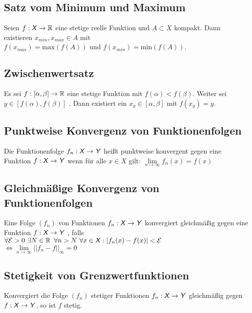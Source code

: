 \documentclass[german]{latex4ei/latex4ei_sheet}
\begin{document}
\begin{sectionbox}
	\subsection{Satz vom Minimum und Maximum}
	Seien $f : \operatorname{\textsf{\textit{X}}} \rightarrow \operatorname{\mathbb R}$ eine stetige reelle Funktion und $A \subset X$ kompakt. Dann existieren $x_{min},x_{max} \in A$ mit $f(x_{max}) = \text{max} (f(A)) \text{ und } f(x_{min}) = \text{min} (f(A))$.

\end{sectionbox}

\begin{sectionbox}
	\subsection{Zwischenwertsatz}
	Es sei $f : [\alpha,\beta] \rightarrow \operatorname{\mathbb R}$ eine stetige Funktion mit $f(\alpha) < f(\beta)$. Weiter sei $y \in [f(\alpha),f(\beta)]$ . Dann existiert ein $x_y \in [\alpha,\beta]$ mit $f(x_y) = y$.

\end{sectionbox}


\begin{sectionbox}
	\subsection{Punktweise Konvergenz von Funktionenfolgen}
	Die Funktionenfolge $f_n : \operatorname{\textsf{\textit{X}}} \rightarrow \operatorname{\textsf{\textit{Y}}}$ heißt punktweise konvergent gegen eine Funktion $f : \operatorname{\textsf{\textit{X}}} \rightarrow \operatorname{\textsf{\textit{Y}}}$ wenn für alle $x \in X$ gilt: $\lim \limits_{n \to \infty} f_n(x)=f(x)$
	
	\end{sectionbox}


\begin{sectionbox}
	\subsection{Gleichmäßige Konvergenz von Funktionenfolgen}
	Eine Folge $(f_n)$ von Funktionen $f_n : \operatorname{\textsf{\textit{X}}} \rightarrow \operatorname{\textsf{\textit{Y}}}$ konvergiert
gleichmäßig  gegen eine Funktion $f : \operatorname{\textsf{\textit{X}}} \rightarrow \operatorname{\textsf{\textit{Y}}}$ , falls \\
	$\forall \mathcal{E}>0 \text{  } \exists N \in \operatorname{\mathbb R} \text{   } \forall n > N \text{   } \forall x \in \operatorname{\textsf{\textit{X}}}: |f_n(x)-f(x)|<\mathcal{E}$\\
	$\Leftrightarrow \lim \limits_{n \to \infty} ||f_n-f ||_\infty = 0$


\end{sectionbox}
\begin{sectionbox}
	\subsection{Stetigkeit von Grenzwertfunktionen}
		Konvergiert die Folge $(f_n)$ stetiger Funktionen $f_n : \operatorname{\textsf{\textit{X}}} \rightarrow \operatorname{\textsf{\textit{Y}}}$ gleichmäßig gegen $f :\operatorname{\textsf{\textit{X}}} \rightarrow \operatorname{\textsf{\textit{Y}}}$, so ist $f$ stetig.

\end{sectionbox}
\end{document}
